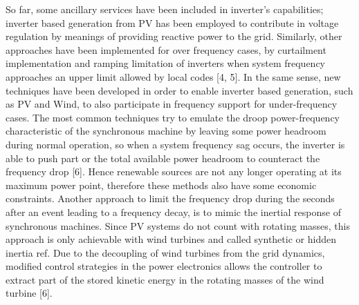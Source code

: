  So far, some ancillary services have been included in inverter’s capabilities; inverter based generation from PV has been employed to contribute in voltage regulation by meanings of providing reactive power to the grid. Similarly, other approaches have been implemented for over frequency cases, by curtailment implementation and ramping limitation of inverters when system frequency approaches an upper limit allowed by local codes [4, 5]. In the same sense, new techniques have been developed in order to enable inverter based generation, such as PV and Wind, to also participate in frequency support for under-frequency cases. The most common techniques try to emulate the droop power-frequency characteristic of the synchronous machine by leaving some power headroom during normal operation, so when a system frequency sag occurs, the inverter is able to push part or the total available power headroom to counteract the frequency drop [6]. Hence renewable sources are not any longer operating at its maximum power point, therefore these methods also have some economic constraints. Another approach to limit the frequency drop during the seconds after an event leading to a frequency decay, is to mimic the inertial response of synchronous machines. Since PV systems do not count with rotating masses, this approach is only achievable with wind turbines and called synthetic or hidden inertia ref. Due to the decoupling of wind turbines from the grid dynamics, modified control strategies in the power electronics allows the controller to extract part of the stored kinetic energy in the rotating masses of the wind turbine [6]. 

